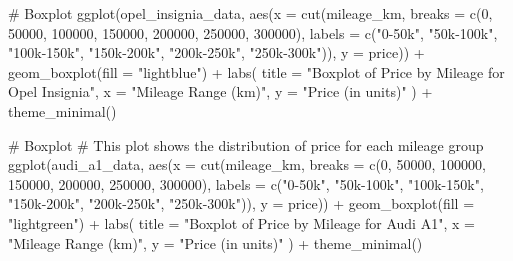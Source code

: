 \documentclass[
  letterpaper,
  DIV=11,
  numbers=noendperiod]{scrartcl}
\newenvironment{Shaded}{\begin{snugshade}}{\end{snugshade}}
\newcommand{\AttributeTok}[1]{\textcolor[rgb]{0.40,0.45,0.13}{#1}}
\newcommand{\CommentTok}[1]{\textcolor[rgb]{0.37,0.37,0.37}{#1}}
\newcommand{\DecValTok}[1]{\textcolor[rgb]{0.68,0.00,0.00}{#1}}
\newcommand{\FunctionTok}[1]{\textcolor[rgb]{0.28,0.35,0.67}{#1}}
\newcommand{\NormalTok}[1]{\textcolor[rgb]{0.00,0.23,0.31}{#1}}
\newcommand{\SpecialCharTok}[1]{\textcolor[rgb]{0.37,0.37,0.37}{#1}}
\newcommand{\StringTok}[1]{\textcolor[rgb]{0.13,0.47,0.30}{#1}}
\begin{document}
\begin{Shaded}
\begin{Highlighting}[]
\CommentTok{\# Boxplot}
\FunctionTok{ggplot}\NormalTok{(opel\_insignia\_data, }\FunctionTok{aes}\NormalTok{(}\AttributeTok{x =} \FunctionTok{cut}\NormalTok{(mileage\_km, }\AttributeTok{breaks =} \FunctionTok{c}\NormalTok{(}\DecValTok{0}\NormalTok{, }\DecValTok{50000}\NormalTok{, }\DecValTok{100000}\NormalTok{, }\DecValTok{150000}\NormalTok{, }\DecValTok{200000}\NormalTok{, }\DecValTok{250000}\NormalTok{, }\DecValTok{300000}\NormalTok{),}
                                     \AttributeTok{labels =} \FunctionTok{c}\NormalTok{(}\StringTok{"0{-}50k"}\NormalTok{, }\StringTok{"50k{-}100k"}\NormalTok{, }\StringTok{"100k{-}150k"}\NormalTok{, }\StringTok{"150k{-}200k"}\NormalTok{, }\StringTok{"200k{-}250k"}\NormalTok{, }\StringTok{"250k{-}300k"}\NormalTok{)),}
                             \AttributeTok{y =}\NormalTok{ price)) }\SpecialCharTok{+}
  \FunctionTok{geom\_boxplot}\NormalTok{(}\AttributeTok{fill =} \StringTok{"lightblue"}\NormalTok{) }\SpecialCharTok{+}
  \FunctionTok{labs}\NormalTok{(}
    \AttributeTok{title =} \StringTok{"Boxplot of Price by Mileage for Opel Insignia"}\NormalTok{,}
    \AttributeTok{x =} \StringTok{"Mileage Range (km)"}\NormalTok{,}
    \AttributeTok{y =} \StringTok{"Price (in units)"}
\NormalTok{  ) }\SpecialCharTok{+}
  \FunctionTok{theme\_minimal}\NormalTok{()}

\CommentTok{\# Boxplot}
\CommentTok{\# This plot shows the distribution of price for each mileage group}
\FunctionTok{ggplot}\NormalTok{(audi\_a1\_data, }\FunctionTok{aes}\NormalTok{(}\AttributeTok{x =} \FunctionTok{cut}\NormalTok{(mileage\_km, }\AttributeTok{breaks =} \FunctionTok{c}\NormalTok{(}\DecValTok{0}\NormalTok{, }\DecValTok{50000}\NormalTok{, }\DecValTok{100000}\NormalTok{, }\DecValTok{150000}\NormalTok{, }\DecValTok{200000}\NormalTok{, }\DecValTok{250000}\NormalTok{, }\DecValTok{300000}\NormalTok{),}
                                \AttributeTok{labels =} \FunctionTok{c}\NormalTok{(}\StringTok{"0{-}50k"}\NormalTok{, }\StringTok{"50k{-}100k"}\NormalTok{, }\StringTok{"100k{-}150k"}\NormalTok{, }\StringTok{"150k{-}200k"}\NormalTok{, }\StringTok{"200k{-}250k"}\NormalTok{, }\StringTok{"250k{-}300k"}\NormalTok{)),}
                        \AttributeTok{y =}\NormalTok{ price)) }\SpecialCharTok{+}
  \FunctionTok{geom\_boxplot}\NormalTok{(}\AttributeTok{fill =} \StringTok{"lightgreen"}\NormalTok{) }\SpecialCharTok{+}
  \FunctionTok{labs}\NormalTok{(}
    \AttributeTok{title =} \StringTok{"Boxplot of Price by Mileage for Audi A1"}\NormalTok{,}
    \AttributeTok{x =} \StringTok{"Mileage Range (km)"}\NormalTok{,}
    \AttributeTok{y =} \StringTok{"Price (in units)"}
\NormalTok{  ) }\SpecialCharTok{+}
  \FunctionTok{theme\_minimal}\NormalTok{()}


\end{Highlighting}
\end{Shaded}
\end{document}
